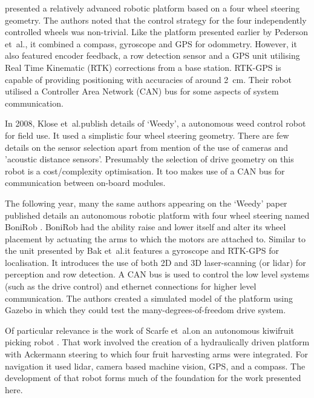 \documentclass[preprint,authoryear,12pt]{elsarticle}
\begin{document}
    \cite{Bak2004} presented a relatively advanced robotic platform based on a four wheel steering geometry.
    The authors noted that the control strategy for the four independently controlled wheels was non-trivial.
    Like the platform presented earlier by Pederson et~al.\@, it combined a compass, gyroscope and GPS for odommetry.
    However, it also featured encoder feedback, a row detection sensor and a GPS unit utilising Real Time Kinematic (RTK) corrections from a base station.
    RTK-GPS is capable of providing positioning with accuracies of around \SI{2}{\centi\meter}.
    Their robot utilised a Controller Area Network (CAN) bus for some aspects of system communication.

    In 2008, Klose et~al.\@ publish details of `Weedy', a autonomous weed control robot for field use.
    It used a simplistic four wheel steering geometry.
    There are few details on the sensor selection apart from mention of the use of cameras and 'acoustic distance sensors'.
    Presumably the selection of drive geometry on this robot is a cost/complexity optimisation.
    It too makes use of a CAN bus for communication between on-board modules.

    The following year, many the same authors appearing on the `Weedy' paper published details an autonomous robotic platform with four wheel steering named BoniRob \citep{Ruckelshausen2009}.
    BoniRob had the ability raise and lower itself and alter its wheel placement by actuating the arms to which the motors are attached to.
    Similar to the unit presented by Bak et~al.\@ it features a gyroscope and RTK-GPS for localisation.
    It introduces the use of both 2D and 3D laser-scanning (or lidar) for perception and row detection.
    A CAN bus is used to control the low level systems (such as the drive control) and ethernet connections for higher level communication.
    The authors created a simulated model of the platform using Gazebo in which they could test the many-degrees-of-freedom drive system.

    Of particular relevance is the work of Scarfe et~al.\@ on an autonomous kiwifruit picking robot \citep{scarfe2009, Scarfe2012}.
    That work involved the creation of a hydraulically driven platform with Ackermann steering to which four fruit harvesting arms were integrated.
    For navigation it used lidar, camera based machine vision, GPS, and a compass.
    The development of that robot forms much of the foundation for the work presented here.
\end{document}
